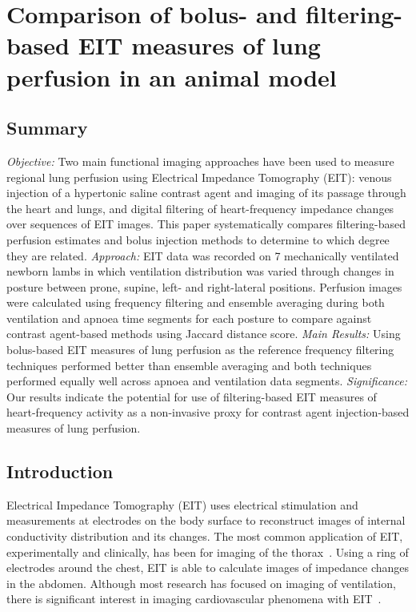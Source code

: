 \chapter{Comparison of bolus- and filtering-based EIT measures of lung perfusion in an animal model}

\section{Summary}
    \emph{Objective:} Two main functional imaging approaches have been used to measure regional lung perfusion 
    using Electrical Impedance Tomography (EIT): venous injection of a hypertonic saline contrast
    agent and imaging of its passage through the heart and lungs, and digital filtering 
    of heart-frequency impedance changes over sequences of EIT images.
    This paper systematically compares filtering-based perfusion estimates and 
    bolus injection methods to determine to which degree they are related.
    \emph{Approach:} EIT data was recorded on 7 mechanically ventilated newborn lambs in which 
    ventilation distribution was varied through changes in posture
    between prone, supine, left- and right-lateral positions.
    Perfusion images were calculated using frequency filtering and ensemble averaging 
    during both ventilation and apnoea time segments for each posture to compare against 
    contrast agent-based methods using Jaccard distance score. 
    \emph{Main Results:} Using bolus-based EIT measures of lung perfusion as the reference
    frequency filtering techniques performed better than ensemble averaging
    and both techniques performed equally well across apnoea and ventilation data segments.
    \emph{Significance:} Our results indicate the potential for use of
    filtering-based EIT measures of heart-frequency activity as a non-invasive
    proxy for contrast agent injection-based measures of lung perfusion. 

\section{Introduction}

Electrical Impedance Tomography (EIT) uses electrical stimulation and measurements at electrodes on the
body surface to reconstruct images of internal conductivity
distribution and its changes.
The most common application of EIT, experimentally and clinically,
has been for imaging of the thorax~\parencite{frerichs_chest_2017}.
Using a ring of electrodes around the chest, EIT is able to calculate
images of impedance changes in the abdomen.
Although most research has focused on
imaging of ventilation, there is significant interest in imaging
cardiovascular phenomena with EIT~\parencite{adler_whither_2012,leonhardt_electrical_2012}. 


